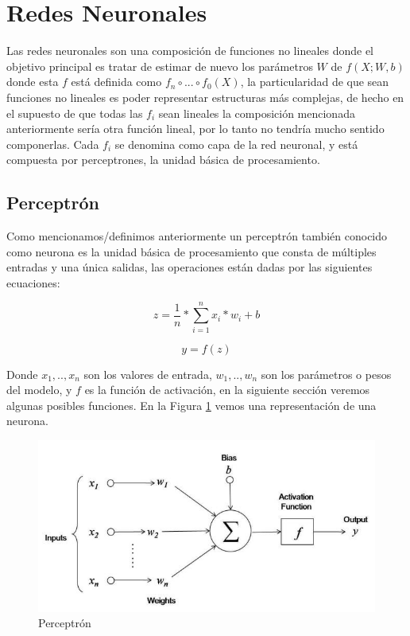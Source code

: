 \section{Redes Neuronales}
Las redes neuronales son una composición de funciones no lineales donde el objetivo principal es tratar de estimar de nuevo los parámetros $W$ de $f(X; W,b)$ donde esta $f$ está definida como $f_{n} \circ ... \circ f_{0}(X)$, la particularidad de que sean funciones no lineales es poder representar estructuras más complejas, de hecho en el supuesto de que todas las $f_{i}$ sean lineales la composición mencionada anteriormente sería otra función lineal, por lo tanto no tendría mucho sentido componerlas.
Cada $f_{i}$ se denomina como capa de la red neuronal, y está compuesta por perceptrones, la unidad básica de procesamiento.

\subsection{Perceptrón}
Como mencionamos/definimos anteriormente un perceptrón también conocido como neurona es la unidad básica de procesamiento que consta de múltiples entradas y una única salidas, las operaciones están dadas por las siguientes ecuaciones:

\[z = \frac{1}{n} * \sum_{i=1}^{n} x_{i}*w_{i} + b\]

\[y = f(z)\]

Donde $x_{1},..,x_{n}$ son los valores de entrada, $w_{1},..,w_{n}$ son los parámetros o pesos del modelo, y $f$ es la función de activación, en la siguiente sección veremos algunas posibles funciones. En la Figura \ref{fig:perceptron} vemos una representación de una neurona.

\begin{figure}
\begin{center}
    \includegraphics[width=\textwidth]{images/image204.png}
    \caption{Perceptrón}
    \label{fig:perceptron}
\end{center}
\end{figure}


